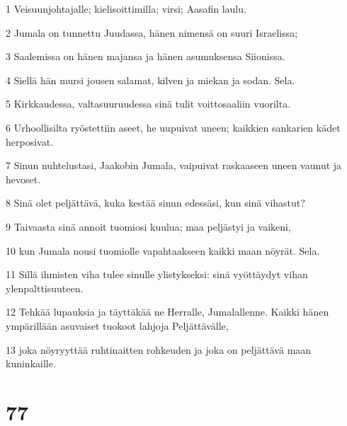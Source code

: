 \par 1 Veisuunjohtajalle; kielisoittimilla; virsi; Aasafin laulu.
\par 2 Jumala on tunnettu Juudassa, hänen nimensä on suuri Israelissa;
\par 3 Saalemissa on hänen majansa ja hänen asumuksensa Siionissa.
\par 4 Siellä hän mursi jousen salamat, kilven ja miekan ja sodan. Sela.
\par 5 Kirkkaudessa, valtasuuruudessa sinä tulit voittosaaliin vuorilta.
\par 6 Urhoollisilta ryöstettiin aseet, he uupuivat uneen; kaikkien sankarien kädet herposivat.
\par 7 Sinun nuhtelustasi, Jaakobin Jumala, vaipuivat raskaaseen uneen vaunut ja hevoset.
\par 8 Sinä olet peljättävä, kuka kestää sinun edessäsi, kun sinä vihastut?
\par 9 Taivaasta sinä annoit tuomiosi kuulua; maa peljästyi ja vaikeni,
\par 10 kun Jumala nousi tuomiolle vapahtaakseen kaikki maan nöyrät. Sela.
\par 11 Sillä ihmisten viha tulee sinulle ylistykseksi: sinä vyöttäydyt vihan ylenpalttisuuteen.
\par 12 Tehkää lupauksia ja täyttäkää ne Herralle, Jumalallenne. Kaikki hänen ympärillään asuvaiset tuokoot lahjoja Peljättävälle,
\par 13 joka nöyryyttää ruhtinaitten rohkeuden ja joka on peljättävä maan kuninkaille.

\chapter{77}

